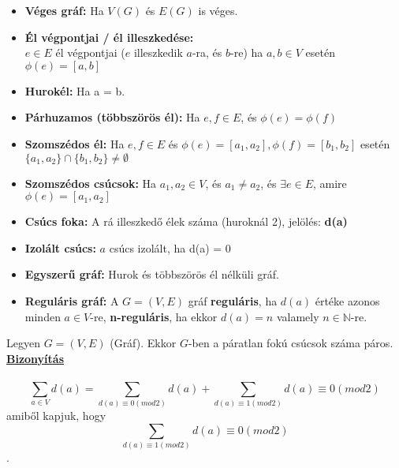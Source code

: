 \documentclass{beamer}
\newcommand{\msmallskip}{\vspace{0.3em}}
\newcommand{\mmedskip}{\vspace{0.5em}}
\begin{document}
\begin{frame}

\begin{tcolorbox}[title={Egyéb definíciók}]
\begin{itemize}
\item \textbf{Véges gráf:} Ha $V(G)$ és $E(G)$ is véges.
\item \textbf{Él végpontjai / él illeszkedése:}\\
$e \in E$ él végpontjai ($e$ illeszkedik $a$-ra, és $b$-re) ha $a, b \in V$ esetén ${\phi}(e) = [a, b]$
\item \textbf{Hurokél:} Ha a = b.
\item \textbf{Párhuzamos (többszörös él):} Ha $e, f \in E$, és ${\phi}(e) = {\phi}(f)$
\item \textbf{Szomszédos él:} Ha $e, f \in E$ és ${\phi}(e) = [a_1, a_2], {\phi}(f) = [b_1, b_2]$ esetén $\{a_1, a_2\} \cap \{b_1, b_2\} \neq \emptyset$
\item \textbf{Szomszédos csúcsok:} Ha $a_1, a_2 \in V$, és $a_1 \neq a_2$, és ${\exists}e \in E$, amire ${\phi}(e) = [a_1, a_2]$
\item \textbf{Csúcs foka:} A rá illeszkedő élek száma (huroknál 2), jelölés: \textbf{d(a)}
\item \textbf{Izolált csúcs:} $a$ csúcs izolált, ha d(a) = 0
\item \textbf{Egyszerű gráf:} Hurok és többszörös él nélküli gráf.
\item \textbf{Reguláris gráf:} A $G = (V, E)$ gráf \textbf{reguláris}, ha $d(a)$ értéke azonos minden $a \in V$-re, \textbf{n-reguláris}, ha ekkor $d(a) = n$ valamely $n \in \mathbb{N}$-re.
\end{itemize}
\end{tcolorbox}

\end{frame}

\begin{frame}

\begin{tcolorbox}[title={Tétel: Fokszám-Élszám}]
Legyen $G = (V, E)$ (Gráf). Ekkor $G$-ben a páratlan fokú csúcsok száma páros.\\
\tcblower
\msmallskip
\underline{\textbf{Bizonyítás}}\\
\mmedskip
\\
$$\sum_{a \in V} d(a) = \sum_{d(a) \equiv 0 (mod 2)} d(a) + \sum_{d(a) \equiv 1 (mod 2)} d(a) \equiv 0 (mod 2)$$
amiből kapjuk, hogy $$\sum_{d(a) \equiv 1 (mod 2)} d(a) \equiv 0 (mod 2)$$.

\end{tcolorbox}

\end{frame}
\end{document}

